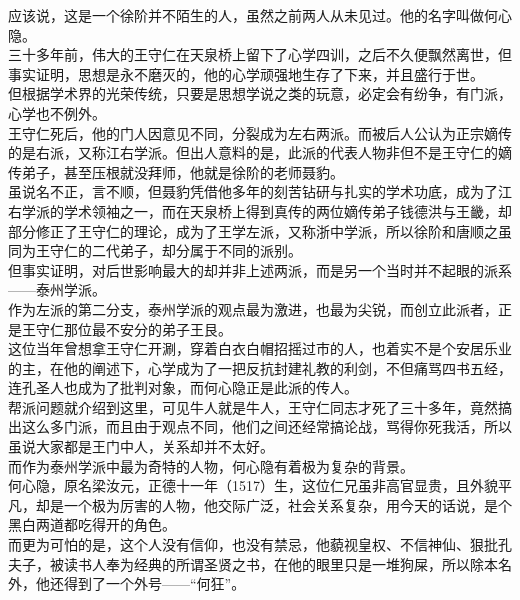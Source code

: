 \begin{multicols}{\theparacolNo}
应该说，这是一个徐阶并不陌生的人，虽然之前两人从未见过。他的名字叫做何心隐。\\

三十多年前，伟大的王守仁在天泉桥上留下了心学四训，之后不久便飘然离世，但事实证明，思想是永不磨灭的，他的心学顽强地生存了下来，并且盛行于世。\\

但根据学术界的光荣传统，只要是思想学说之类的玩意，必定会有纷争，有门派，心学也不例外。\\

王守仁死后，他的门人因意见不同，分裂成为左右两派。而被后人公认为正宗嫡传的是右派，又称江右学派。但出人意料的是，此派的代表人物非但不是王守仁的嫡传弟子，甚至压根就没拜师，他就是徐阶的老师聂豹。\\

虽说名不正，言不顺，但聂豹凭借他多年的刻苦钻研与扎实的学术功底，成为了江右学派的学术领袖之一，而在天泉桥上得到真传的两位嫡传弟子钱德洪与王畿，却部分修正了王守仁的理论，成为了王学左派，又称浙中学派，所以徐阶和唐顺之虽同为王守仁的二代弟子，却分属于不同的派别。\\

但事实证明，对后世影响最大的却并非上述两派，而是另一个当时并不起眼的派系——泰州学派。\\

作为左派的第二分支，泰州学派的观点最为激进，也最为尖锐，而创立此派者，正是王守仁那位最不安分的弟子王艮。\\

这位当年曾想拿王守仁开涮，穿着白衣白帽招摇过市的人，也着实不是个安居乐业的主，在他的阐述下，心学成为了一把反抗封建礼教的利剑，不但痛骂四书五经，连孔圣人也成为了批判对象，而何心隐正是此派的传人。\\

帮派问题就介绍到这里，可见牛人就是牛人，王守仁同志才死了三十多年，竟然搞出这么多门派，而且由于观点不同，他们之间还经常搞论战，骂得你死我活，所以虽说大家都是王门中人，关系却并不太好。\\

而作为泰州学派中最为奇特的人物，何心隐有着极为复杂的背景。\\

何心隐，原名梁汝元，正德十一年（1517）生，这位仁兄虽非高官显贵，且外貌平凡，却是一个极为厉害的人物，他交际广泛，社会关系复杂，用今天的话说，是个黑白两道都吃得开的角色。\\

而更为可怕的是，这个人没有信仰，也没有禁忌，他藐视皇权、不信神仙、狠批孔夫子，被读书人奉为经典的所谓圣贤之书，在他的眼里只是一堆狗屎，所以除本名外，他还得到了一个外号——“何狂”。\\


\end{multicols}
